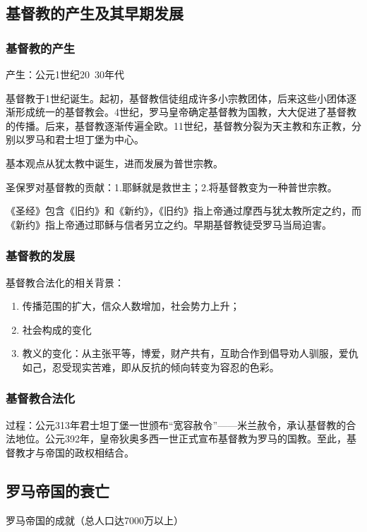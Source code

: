 \subsection{基督教的产生及其早期发展}

\subsubsection{基督教的产生}
产生：公元1世纪20~30年代

基督教于1世纪诞生。起初，基督教信徒组成许多小宗教团体，后来这些小团体逐渐形成统一的基督教会。4世纪，罗马皇帝确定基督教为国教，大大促进了基督教的传播。后来，基督教逐渐传遍全欧。11世纪，基督教分裂为天主教和东正教，分别以罗马和君士坦丁堡为中心。

基本观点从犹太教中诞生，进而发展为普世宗教。

圣保罗对基督教的贡献：1.耶稣就是救世主；2.将基督教变为一种普世宗教。

《圣经》包含《旧约》和《新约》，《旧约》指上帝通过摩西与犹太教所定之约，而《新约》指上帝通过耶稣与信者另立之约。早期基督教徒受罗马当局迫害。

\subsubsection{基督教的发展}

基督教合法化的相关背景：
\begin{enumerate}
    \item 传播范围的扩大，信众人数增加，社会势力上升；
    \item 社会构成的变化
    \item 教义的变化：从主张平等，博爱，财产共有，互助合作到倡导劝人驯服，爱仇如己，忍受现实苦难，即从反抗的倾向转变为容忍的色彩。
\end{enumerate}

\subsubsection{基督教合法化}

过程：公元313年君士坦丁堡一世颁布“宽容赦令”——米兰赦令，承认基督教的合法地位。公元392年，皇帝狄奥多西一世正式宣布基督教为罗马的国教。至此，基督教才与帝国的政权相结合。

\subsection{罗马帝国的衰亡}

罗马帝国的成就（总人口达7000万以上）

